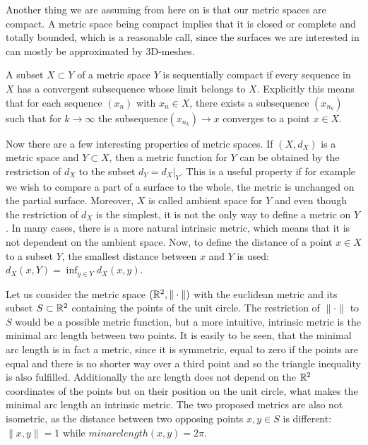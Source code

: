 Another thing we are assuming from here on is that our metric spaces are compact.
A metric space being compact implies that it is closed or complete and totally bounded, which is a reasonable call, since the surfaces we are interested in can mostly be approximated by 3D-meshes.
\begin{mydef}
	A subset $X \subset Y$ of a metric space $Y$ is sequentially compact if every sequence in $X$ has a convergent subsequence whose limit belongs to $X$.
	Explicitly this means that for each sequence $(x_n)$ with $x_n \in X$, there exists a subsequence $(x_{n_k})$ such that for $k \rightarrow \infty$ the subsequence$(x_{n_k}) \rightarrow x$ converges to a point $x\in X$.
\end{mydef}

Now there are a few interesting properties of metric spaces.
If $(X,d_X)$ is a metric space and $Y \subset X$, then a metric function for $Y$ can be obtained by the restriction of $d_X$ to the subset $d_Y = \left.d_X\right|_Y$.
This is a useful property if for example we wish to compare a part of a surface to the whole, the metric is unchanged on the partial surface.
Moreover, $X$ is called ambient space for $Y$ and even though the restriction of $d_X$ is the simplest, it is not the only way to define a metric on $Y$.
In many cases, there is a more natural intrinsic metric, which means that it is not dependent on the ambient space.
Now, to define the distance of a point $x \in X$ to a subset $Y$, the smallest distance between $x$ and $Y$ is used: $d_X(x,Y) = \inf_{y \in Y} d_X(x,y)$.

\begin{example}
Let us consider the metric space $(\mathbb{R}^2, \|\cdot\|)$ with the euclidean metric and its subset $S \subset \mathbb{R}^2$ containing the points of the unit circle.
The restriction of $\|\cdot\|$ to $S$ would be a possible metric function, but a more intuitive, intrinsic metric is the minimal arc length between two points.
It is easily to be seen, that the minimal arc length is in fact a metric, since it is symmetric, equal to zero if the points are equal and there is no shorter way over a third point and so the triangle inequality is also fulfilled.
Additionally the arc length does not depend on the $\mathbb{R}^2$ coordinates of the points but on their position on the unit circle, what makes the minimal arc length an intrinsic metric.
The two proposed metrics are also not isometric, as the distance between two opposing points $x,y\in S$ is different: $\|x,y\| = 1$ while $minarclength(x,y) = 2\pi$.
\end{example}

